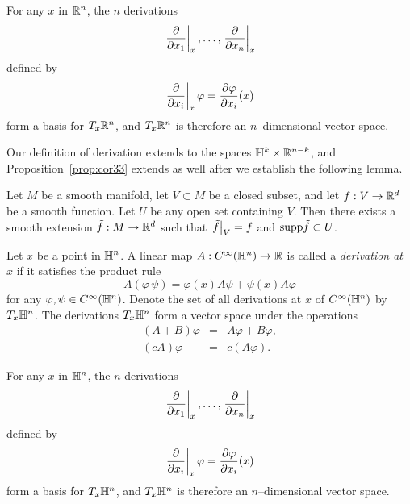 \begin{prop}
	\label{prop:cor33}
	For any $x$ in $\mathbb{R}^n$, the $n$ derivations
	\[
		\left.\frac{\partial}{\partial x_1}\right|_{x}, \dots, \left.\frac{\partial}{\partial x_n}\right|_{x}
	\]
	defined by
	\[
		\left.\frac{\partial}{\partial x_i}\right|_{x}\varphi=\frac{\partial \varphi}{\partial x_i}(x)
	\]
	form a basis for $T_x\mathbb{R}^n$, and $T_x\mathbb{R}^n$ is therefore an $n$--dimensional vector space. 
\end{prop}

Our definition of derivation extends to the spaces $\mathbb{H}^k\times\mathbb{R}^{n-k}$, and Proposition~\ref{prop:cor33} extends as well after we establish the following lemma.

\begin{lem}
	\label{lem:ext}
	Let $M$ be a smooth manifold, let $V\subset M$ be a closed subset, and let $f:V\to\mathbb{R}^d$ be a smooth function.
	Let $U$ be any open set containing $V$.
	Then there exists a smooth extension $\tilde{f}:M\to\mathbb{R}^d$ such that $\left.\tilde{f}\right|_{V}=f$ and $\textrm{supp} \tilde{f}\subset U$.
\end{lem}

\begin{defn}[Derivations on $\HH^n$]
	Let $x$ be a point in $\HH^n$.
	A linear map $A:C^\infty(\mathbb{H}^n)\to\mathbb{R}$ is called a \emph{derivation at $x$} if it satisfies the product rule
	\[
	A(\varphi\,\psi)=\varphi(x)A\psi+\psi(x)A\varphi
	\]
	for any $\varphi,\psi\in C^\infty(\mathbb{H}^n)$.
	Denote the set of all derivations at $x$ of $C^\infty(\mathbb{H}^n)$ by $T_x \mathbb{H}^n$.
	The derivations $T_x \mathbb{H}^n$ form a vector space under the operations
	\[
	\begin{array}{rcl}
	(A+B)\varphi&=&A\varphi+B\varphi,\\
	(cA)\varphi&=&c(A\varphi).
	\end{array}
	\]
\end{defn}

\begin{prop}
	\label{prop:cor310}
	For any $x$ in $\HH^n$, the $n$ derivations
	\[
	\left.\frac{\partial}{\partial x_1}\right|_{x}, \dots, \left.\frac{\partial}{\partial x_n}\right|_{x}
	\]
	defined by
	\[
	\left.\frac{\partial}{\partial x_i}\right|_{x}\varphi=\frac{\partial \varphi}{\partial x_i}(x)
	\]
	form a basis for $T_x\mathbb{H}^n$, and $T_x\mathbb{H}^n$ is therefore an $n$--dimensional vector space. 
\end{prop}

